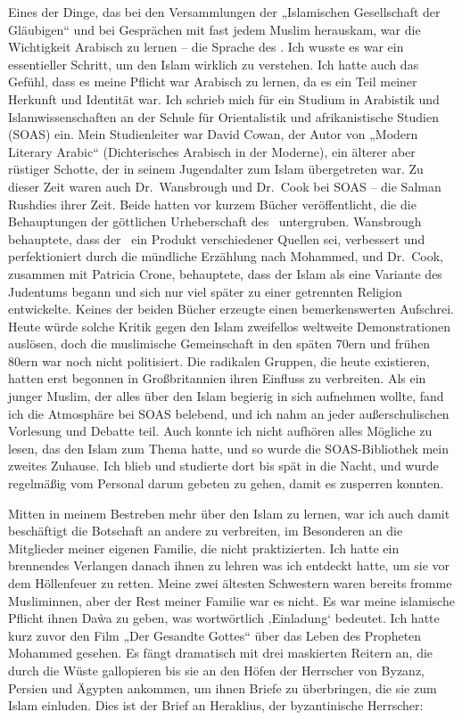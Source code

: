 \documentclass[12pt]{memoir}
\begin{document}
Eines der Dinge, das bei den Versammlungen
der „Islamischen Gesellschaft der Gläubigen“ und bei Gesprächen
mit fast jedem Muslim herauskam,
war die Wichtigkeit Arabisch zu lernen – die Sprache des \Quran.
Ich wusste es war ein essentieller Schritt,
um den Islam wirklich zu verstehen.
Ich hatte auch das Gefühl, dass es meine Pflicht war Arabisch zu lernen,
da es ein Teil meiner Herkunft und Identität war.
Ich schrieb mich für ein Studium in Arabistik und Islamwissenschaften
an der Schule für Orientalistik und afrikanistische Studien (SOAS) ein.
Mein Studienleiter war David Cowan, der Autor von „Modern Literary Arabic“
(Dichterisches Arabisch in der Moderne), ein älterer aber rüstiger Schotte,
der in seinem Jugendalter zum Islam übergetreten war.
Zu dieser Zeit waren auch Dr.\ Wansbrough und Dr.\ Cook bei SOAS –
die Salman Rushdies ihrer Zeit.
Beide hatten vor kurzem Bücher veröffentlicht,
die die Behauptungen der göttlichen Urheberschaft des \Quran\ untergruben.
Wansbrough behauptete, dass der \Quran\ ein Produkt verschiedener Quellen sei,
verbessert und perfektioniert durch die mündliche Erzählung nach Mohammed,
und Dr.\ Cook, zusammen mit Patricia Crone, behauptete,
dass der Islam als eine Variante des Judentums begann
und sich nur viel später zu einer getrennten Religion entwickelte.
Keines der beiden Bücher erzeugte einen bemerkenswerten Aufschrei.
Heute würde solche Kritik gegen den Islam zweifellos
weltweite Demonstrationen auslösen,
doch die muslimische Gemeinschaft in den späten 70ern und frühen 80ern
war noch nicht politisiert.
Die radikalen Gruppen, die heute existieren,
hatten erst begonnen in Großbritannien ihren Einfluss zu verbreiten.
Als ein junger Muslim,
der alles über den Islam begierig in sich aufnehmen wollte,
fand ich die Atmosphäre bei SOAS belebend,
und ich nahm an jeder außerschulischen Vorlesung und Debatte teil.
Auch konnte ich nicht aufhören alles Mögliche zu lesen,
das den Islam zum Thema hatte,
und so wurde die SOAS-Bibliothek mein zweites Zuhause.
Ich blieb und studierte dort bis spät in die Nacht,
und wurde regelmäßig vom Personal darum gebeten zu gehen,
damit es zusperren konnten.

Mitten in meinem Bestreben mehr über den Islam zu lernen,
war ich auch damit beschäftigt die Botschaft an andere zu verbreiten,
im Besonderen an die Mitglieder meiner eigenen Familie,
die nicht praktizierten.
Ich hatte ein brennendes Verlangen danach ihnen zu lehren was ich
entdeckt hatte, um sie vor dem Höllenfeuer zu retten.
Meine zwei ältesten Schwestern waren bereits fromme Musliminnen,
aber der Rest meiner Familie war es nicht.
Es war meine islamische Pflicht ihnen Da\`wa zu geben,
was wortwörtlich ‚Einladung‘ bedeutet.
Ich hatte kurz zuvor den Film „Der Gesandte Gottes“
über das Leben des Propheten Mohammed gesehen.
Es fängt dramatisch mit drei maskierten Reitern an,
die durch die Wüste gallopieren bis sie an den Höfen der Herrscher
von Byzanz, Persien und Ägypten ankommen, um ihnen Briefe zu überbringen,
die sie zum Islam einluden.
Dies ist der Brief an Heraklius, der byzantinische Herrscher:
\end{document}
